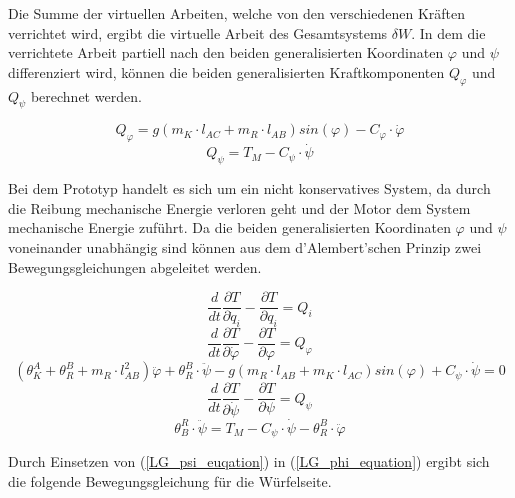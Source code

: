 Die Summe der virtuellen Arbeiten, welche von den verschiedenen Kräften verrichtet wird, ergibt die virtuelle Arbeit des Gesamtsystems $\delta W$. In dem die verrichtete Arbeit partiell nach den beiden generalisierten Koordinaten $\varphi$ und $\psi$ differenziert wird, können die beiden generalisierten Kraftkomponenten $Q_{\varphi}$ und $Q_{\psi}$ berechnet werden.

\begin{equation}
Q_{\varphi} = g(m_K \cdot l_{AC} + m_R \cdot l_{AB})sin(\varphi) - C_{\varphi} \cdot \dot{\varphi}
\end{equation}
\begin{equation}
Q_{\psi} = T_M - C_{\psi} \cdot \dot{\psi}
\end{equation}


Bei dem Prototyp handelt es sich um ein nicht konservatives System, da durch die Reibung mechanische Energie verloren geht und der Motor dem System mechanische Energie zuführt. Da die beiden generalisierten Koordinaten $\varphi$ und $\psi$ voneinander unabhängig sind können aus dem d'Alembert'schen Prinzip zwei Bewegungsgleichungen abgeleitet werden.

\begin{equation}
\frac{d}{dt}\frac{\partial T}{\partial \dot{q}_i}-\frac{\partial T}{\partial q_i} = Q_i
\end{equation}
\begin{equation}
\frac{d}{dt}\frac{\partial T}{\partial \dot{\varphi}}-\frac{\partial T}{\partial \varphi} = Q_{\varphi} 
\end{equation}
\begin{equation}
\label{LG_phi_equation}
({\theta}^A_K + {\theta}^B_R + m_R \cdot l_{AB}^2)\ddot{\varphi} + {\theta}^B_R \cdot \ddot{\psi} - g(m_R \cdot l_{AB} + m_K \cdot l_{AC})sin(\varphi) + C_{\psi} \cdot \dot{\psi} = 0
\end{equation}
\begin{equation}
\frac{d}{dt}\frac{\partial T}{\partial \dot{\psi}}-\frac{\partial T}{\partial \psi} = Q_{\psi} 
\end{equation}
\begin{equation}
\label{LG_psi_euqation}
{\theta}^R_B \cdot \ddot{\psi} = T_M - C_{\psi} \cdot \dot{\psi} - {\theta}^B_R \cdot \ddot{\varphi}
\end{equation}

Durch Einsetzen von (\ref{LG_psi_euqation}) in (\ref{LG_phi_equation}) ergibt sich die folgende Bewegungsgleichung für die Würfelseite.


